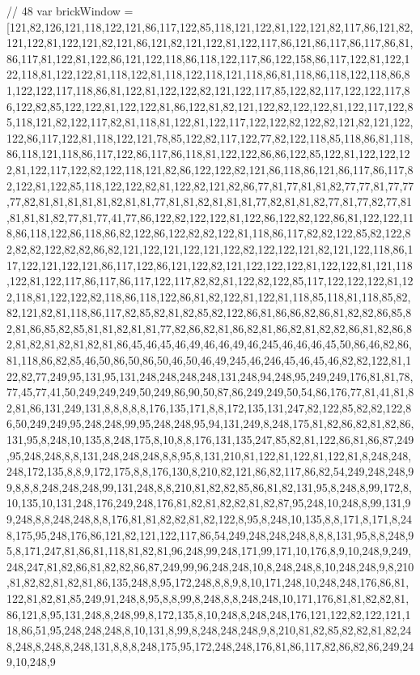 // 48
var brickWindow = [121,82,126,121,118,122,121,86,117,122,85,118,121,122,81,122,121,82,117,86,121,82,121,122,81,122,121,82,121,86,121,82,121,122,81,122,117,86,121,86,117,86,117,86,81,86,117,81,122,81,122,86,121,122,118,86,118,122,117,86,122,158,86,117,122,81,122,122,118,81,122,122,81,118,122,81,118,122,118,121,118,86,81,118,86,118,122,118,86,81,122,122,117,118,86,81,122,81,122,122,82,121,122,117,85,122,82,117,122,122,117,86,122,82,85,122,122,81,122,122,81,86,122,81,82,121,122,82,122,122,81,122,117,122,85,118,121,82,122,117,82,81,118,81,122,81,122,117,122,122,82,122,82,121,82,121,122,122,86,117,122,81,118,122,121,78,85,122,82,117,122,77,82,122,118,85,118,86,81,118,86,118,121,118,86,117,122,86,117,86,118,81,122,122,86,86,122,85,122,81,122,122,122,81,122,117,122,82,122,118,121,82,86,122,122,82,121,86,118,86,121,86,117,86,117,82,122,81,122,85,118,122,122,82,81,122,82,121,82,86,77,81,77,81,81,82,77,77,81,77,77,77,82,81,81,81,81,81,82,81,81,77,81,81,82,81,81,81,77,82,81,81,82,77,81,77,82,77,81,81,81,81,82,77,81,77,41,77,86,122,82,122,122,81,122,86,122,82,122,86,81,122,122,118,86,118,122,86,118,86,82,122,86,122,82,82,122,81,118,86,117,82,82,122,85,82,122,82,82,82,122,82,82,86,82,121,122,121,122,121,122,82,122,122,121,82,121,122,118,86,117,122,121,122,121,86,117,122,86,121,122,82,121,122,122,122,81,122,122,81,121,118,122,81,122,117,86,117,86,117,122,117,82,82,81,122,82,122,85,117,122,122,122,81,122,118,81,122,122,82,118,86,118,122,86,81,82,122,81,122,81,118,85,118,81,118,85,82,82,121,82,81,118,86,117,82,85,82,81,82,85,82,122,86,81,86,86,82,86,81,82,82,86,85,82,81,86,85,82,85,81,81,82,81,81,77,82,86,82,81,86,82,81,86,82,81,82,82,86,81,82,86,82,81,82,81,82,81,82,81,86,45,46,45,46,49,46,46,49,46,245,46,46,46,45,50,86,46,82,86,81,118,86,82,85,46,50,86,50,86,50,46,50,46,49,245,46,246,45,46,45,46,82,82,122,81,122,82,77,249,95,131,95,131,248,248,248,248,131,248,94,248,95,249,249,176,81,81,78,77,45,77,41,50,249,249,249,50,249,86,90,50,87,86,249,249,50,54,86,176,77,81,41,81,82,81,86,131,249,131,8,8,8,8,8,176,135,171,8,8,172,135,131,247,82,122,85,82,82,122,86,50,249,249,95,248,248,99,95,248,248,95,94,131,249,8,248,175,81,82,86,82,81,82,86,131,95,8,248,10,135,8,248,175,8,10,8,8,176,131,135,247,85,82,81,122,86,81,86,87,249,95,248,248,8,8,131,248,248,248,8,8,95,8,131,210,81,122,81,122,81,122,81,8,248,248,248,172,135,8,8,9,172,175,8,8,176,130,8,210,82,121,86,82,117,86,82,54,249,248,248,99,8,8,8,248,248,248,99,131,248,8,8,210,81,82,82,85,86,81,82,131,95,8,248,8,99,172,8,10,135,10,131,248,176,249,248,176,81,82,81,82,82,81,82,87,95,248,10,248,8,99,131,99,248,8,8,248,248,8,8,176,81,81,82,82,81,82,122,8,95,8,248,10,135,8,8,171,8,171,8,248,175,95,248,176,86,121,82,121,122,117,86,54,249,248,248,248,8,8,8,131,95,8,8,248,95,8,171,247,81,86,81,118,81,82,81,96,248,99,248,171,99,171,10,176,8,9,10,248,9,249,248,247,81,82,86,81,82,82,86,87,249,99,96,248,248,10,8,248,248,8,10,248,248,9,8,210,81,82,82,81,82,81,86,135,248,8,95,172,248,8,8,9,8,10,171,248,10,248,248,176,86,81,122,81,82,81,85,249,91,248,8,95,8,8,99,8,248,8,8,248,248,10,171,176,81,81,82,82,81,86,121,8,95,131,248,8,248,99,8,172,135,8,10,248,8,248,248,176,121,122,82,122,121,118,86,51,95,248,248,248,8,10,131,8,99,8,248,248,248,9,8,210,81,82,85,82,82,81,82,248,248,8,248,8,248,131,8,8,8,248,175,95,172,248,248,176,81,86,117,82,86,82,86,249,249,10,248,9